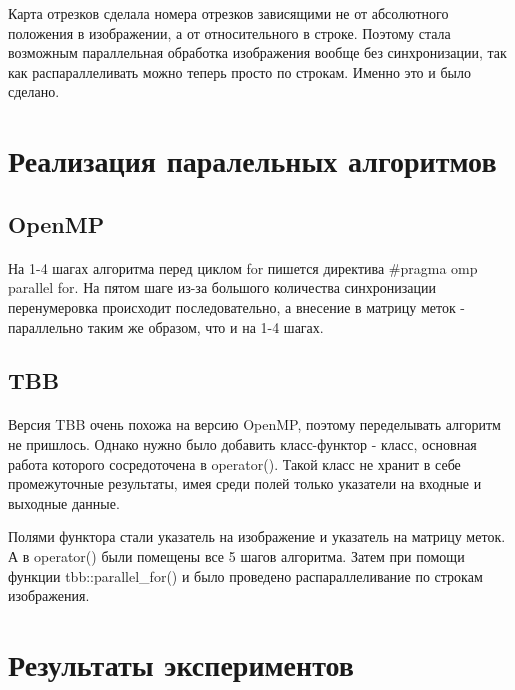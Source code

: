 \documentclass[14pt]{extarticle}
\begin{document}
\par Карта отрезков сделала номера отрезков зависящими не от абсолютного положения в изображении, а от относительного в строке. Поэтому стала возможным параллельная обработка изображения вообще без синхронизации, так как распараллеливать можно теперь просто по строкам. Именно это и было сделано. 
\newpage
\section{Реализация паралельных алгоритмов}
\subsection{OpenMP}
\paragraph{} На 1-4 шагах алгоритма перед циклом for пишется директива \#pragma omp parallel for. На пятом шаге из-за большого количества синхронизации перенумеровка происходит последовательно, а внесение в матрицу меток - параллельно таким же образом, что и на 1-4 шагах.
\subsection{TBB}
\paragraph{} Версия TBB очень похожа на версию OpenMP, поэтому переделывать алгоритм не пришлось. Однако нужно было добавить класс-функтор - класс, основная работа которого сосредоточена в operator(). Такой класс не хранит в себе промежуточные результаты, имея среди полей только указатели на входные и выходные данные.
\par Полями функтора стали указатель на изображение и указатель на матрицу меток. А в operator() были помещены все 5 шагов алгоритма. Затем при помощи функции tbb::parallel\_for() и было проведено распараллеливание по строкам изображения.
\newpage
\section{Результаты экспериментов}
\end{document}
